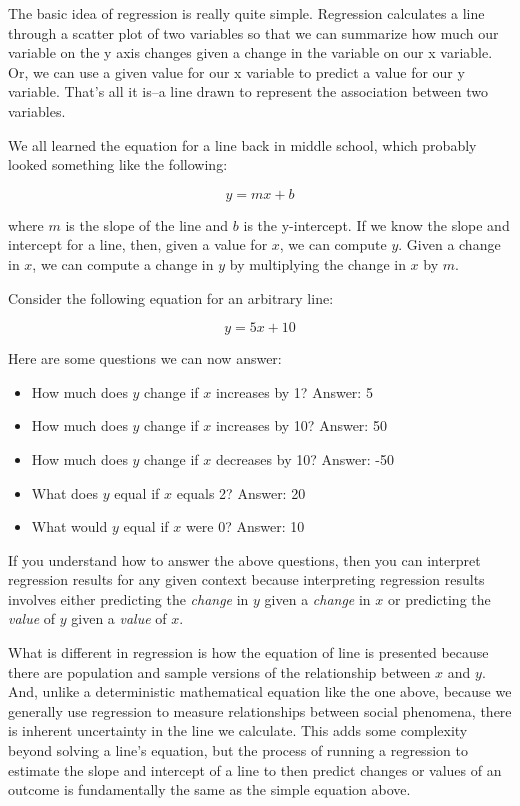 \documentclass[
]{book}
\providecommand{\tightlist}{%
  \setlength{\itemsep}{0pt}\setlength{\parskip}{0pt}}
\begin{document}
The basic idea of regression is really quite simple. Regression calculates a line through a scatter plot of two variables so that we can summarize how much our variable on the y axis changes given a change in the variable on our x variable. Or, we can use a given value for our x variable to predict a value for our y variable. That's all it is--a line drawn to represent the association between two variables.

We all learned the equation for a line back in middle school, which probably looked something like the following:

\begin{equation}
y = mx + b
\label{eq:line}
\end{equation}

where \(m\) is the slope of the line and \(b\) is the y-intercept. If we know the slope and intercept for a line, then, given a value for \(x\), we can compute \(y\). Given a change in \(x\), we can compute a change in \(y\) by multiplying the change in \(x\) by \(m\).

Consider the following equation for an arbitrary line:

\[y = 5x + 10\]

Here are some questions we can now answer:

\begin{itemize}
\tightlist
\item
  How much does \(y\) change if \(x\) increases by 1? Answer: 5
\item
  How much does \(y\) change if \(x\) increases by 10? Answer: 50
\item
  How much does \(y\) change if \(x\) decreases by 10? Answer: -50
\item
  What does \(y\) equal if \(x\) equals 2? Answer: 20
\item
  What would \(y\) equal if \(x\) were 0? Answer: 10
\end{itemize}

If you understand how to answer the above questions, then you can interpret regression results for any given context because interpreting regression results involves either predicting the \emph{change} in \(y\) given a \emph{change} in \(x\) or predicting the \emph{value} of \(y\) given a \emph{value} of \(x\).

What is different in regression is how the equation of line is presented because there are population and sample versions of the relationship between \(x\) and \(y\). And, unlike a deterministic mathematical equation like the one above, because we generally use regression to measure relationships between social phenomena, there is inherent uncertainty in the line we calculate. This adds some complexity beyond solving a line's equation, but the process of running a regression to estimate the slope and intercept of a line to then predict changes or values of an outcome is fundamentally the same as the simple equation above.
\end{document}
